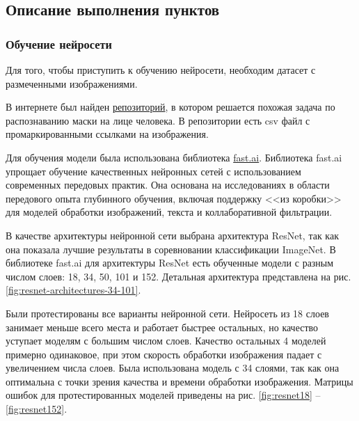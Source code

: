 \documentclass[a4paper,14pt]{article}
\begin{document}
	
	
	
	\subsection{Описание выполнения пунктов}
	
	\subsubsection{Обучение нейросети}
	
	Для того, чтобы приступить к обучению нейросети, необходим датасет с размеченными изображениями.
	
	В интернете был найден \href{https://github.com/UniversalDataTool/coronavirus-mask-image-dataset}{репозиторий}, в котором решается похожая задача по распознаванию маски на лице человека.
	В репозитории есть csv файл с промаркированными ссылками на изображения.
	
	Для обучения модели была использована библиотека \href{https://docs.fast.ai/}{fast.ai}.
	Библиотека fast.ai упрощает обучение качественных нейронных сетей с использованием современных передовых практик.
	Она основана на исследованиях в области передового опыта глубинного обучения, включая поддержку <<из коробки>> для моделей обработки изображений, текста и коллаборативной фильтрации.
	
	В качестве архитектуры нейронной сети выбрана архитектура ResNet, так как она показала лучшие результаты в соревновании классификации ImageNet.
	В библиотеке fast.ai для архитектуры ResNet есть обученные модели с разным числом слоев: 18, 34, 50, 101 и 152.
	Детальная архитектура представлена на рис. \ref{fig:resnet-architectures-34-101}.
	
	Были протестированы все варианты нейронной сети.
	Нейросеть из 18 слоев занимает меньше всего места и работает быстрее остальных, но качество уступает моделям с большим числом слоев.
	Качество остальных 4 моделей примерно одинаковое, при этом скорость обработки изображения падает с увеличением числа слоев.
	Была использована модель с 34 слоями, так как она оптимальна с точки зрения качества и времени обработки изображения.
	Матрицы ошибок для протестированных моделей приведены на рис. \ref{fig:resnet18} -- \ref{fig:resnet152}.
	
\end{document}
